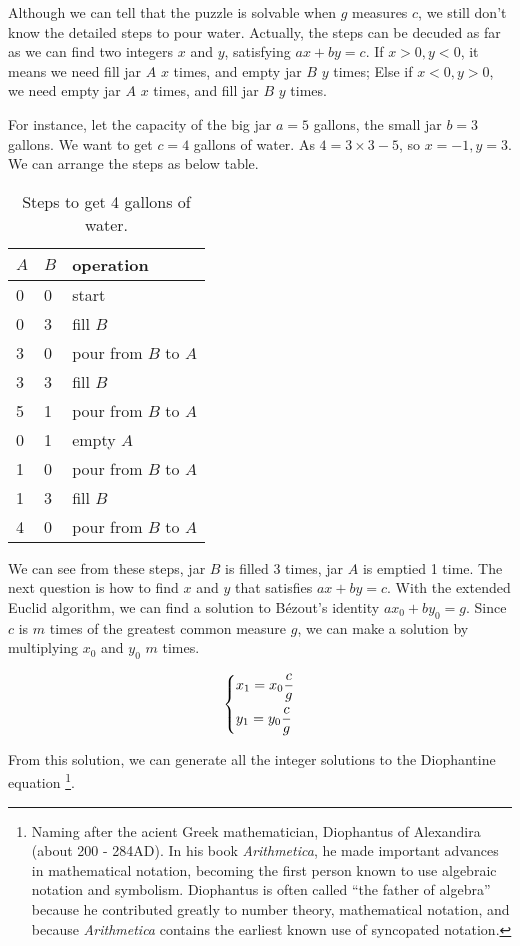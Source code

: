 \documentclass{article}
\begin{document}
Although we can tell that the puzzle is solvable when $g$ measures $c$, we still don't know the detailed steps to pour water. Actually, the steps can be decuded as far as we can find two integers $x$ and $y$, satisfying $ax + by = c$. If $x > 0, y < 0$, it means we need fill jar $A$ $x$ times, and empty jar $B$ $y$ times; Else if $x < 0, y > 0$, we need empty jar $A$ $x$ times, and fill jar $B$ $y$ times.

For instance, let the capacity of the big jar $a = 5$ gallons, the small jar $b = 3$ gallons. We want to get $c=4$ gallons of water. As $4 = 3 \times 3 - 5$, so $x = -1, y = 3$. We can arrange the steps as below table.

\begin{table}[htbp]
\centering
\begin{tabular}{l|l|l}
$A$ & $B$ & operation \\
\hline
0 & 0 & start \\
0 & 3 & fill $B$ \\
3 & 0 & pour from $B$ to $A$ \\
3 & 3 & fill $B$ \\
5 & 1 & pour from $B$ to $A$ \\
0 & 1 & empty $A$ \\
1 & 0 & pour from $B$ to $A$ \\
1 & 3 & fill $B$ \\
4 & 0 & pour from $B$ to $A$ \\
\end{tabular}
\caption{Steps to get 4 gallons of water.} \label{tab:designed-jugs-ops}
\end{table}

We can see from these steps, jar $B$ is filled 3 times, jar $A$ is emptied 1 time. The next question is how to find $x$ and $y$ that satisfies $ax + by = c$. With the extended Euclid algorithm, we can find a solution to Bézout's identity $ax_0 + by_0 = g$. Since $c$ is $m$ times of the greatest common measure $g$, we can make a solution by multiplying $x_0$ and $y_0$ $m$ times.

\[
\begin{dcases}
  x_1 = x_0 \dfrac{c}{g} \\
  y_1 = y_0 \dfrac{c}{g}
\end{dcases}
\]

From this solution, we can generate all the integer solutions to the Diophantine equation \footnote{Naming after the acient Greek mathematician, Diophantus of Alexandira (about 200 - 284AD). In his book \textit{Arithmetica}, he made important advances in mathematical notation, becoming the first person known to use algebraic notation and symbolism. Diophantus is often called ``the father of algebra'' because he contributed greatly to number theory, mathematical notation, and because \textit{Arithmetica} contains the earliest known use of syncopated notation\cite{HanXueTao2009}.}.
\end{document}
